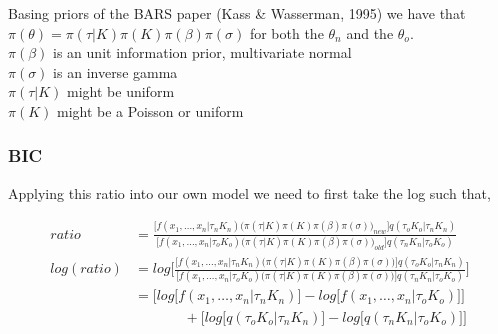 \documentclass[submit]{smj}
\begin{document}
Basing priors of the BARS paper (Kass \& Wasserman, 1995)
we have that \\ $\pi(\theta) = \pi(\tau|K)\pi(K)\pi(\beta)\pi(\sigma)$ for both the $\theta_{n}$ and the $\theta_{o}$. \\
$\pi(\beta)$ is an unit information prior, multivariate normal\\
$\pi(\sigma)$ is an inverse gamma  \\
$\pi(\tau | K)$ might be uniform \\
$\pi(K)$ might be a Poisson or uniform \\

\subsubsection{BIC}
Applying this ratio into our own model we need to first take the log such that,

\begin{align*}
ratio &= \frac{\Big[ f(x_1,\dots,x_n | \tau_{n} K_{n}) %
\big(\pi(\tau|K)\pi(K)\pi(\beta)\pi(\sigma)\big)_{new}%
\Big] 
q(\tau_{o} K_{o} | \tau_{n} K_{n})} %
{\Big[ f(x_1,\dots,x_n | \tau_{o} K_{o}) %
\big(\pi(\tau|K)\pi(K)\pi(\beta)\pi(\sigma)\big)_{old}\Big] %
q(\tau_{n} K_{n}| \tau_{o} K_{o})} %
\\
log(ratio) &= log \Big[\frac{\Big[ f(x_1,\dots,x_n | \tau_{n} K_{n}) %
\big(\pi(\tau|K)\pi(K)\pi(\beta)\pi(\sigma)\big)%
\Big] 
q(\tau_{o} K_{o} | \tau_{n} K_{n})} %
{\Big[ f(x_1,\dots,x_n | \tau_{o} K_{o}) %
\big(\pi(\tau|K)\pi(K)\pi(\beta)\pi(\sigma)\big)\Big] %
q(\tau_{n} K_{n}| \tau_{o} K_{o})} \Big]%
\\
& =\Big[ log \big[ f(x_1,\dots,x_n | \tau_{n} K_{n})
\big] - 
log \big[ f(x_1,\dots,x_n | \tau_{o} K_{o}) \big] \Big]  \\
& \  \ \ \ \ \ \ \  \ \ \ \ \ \ \ \  +  \Big[ log \big[ q(\tau_{o} K_{o} | \tau_{n} K_{n}) \big] - log \big[ q(\tau_{n} K_{n}| \tau_{o} K_{o})  \big] \Big] 
\end{align*}
\end{document}
